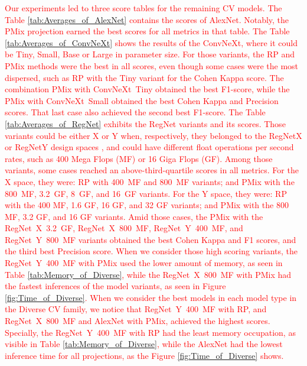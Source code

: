 \textcolor{red}{
Our experiments led to three score tables for the remaining \gls{CV} models.
The Table \ref{tab:Averages_of_AlexNet} contains the scores of AlexNet. Notably, the \gls{PMix} projection earned the best scores for all metrics in that table.
The Table \ref{tab:Averages_of_ConvNeXt} shows the results of the ConvNeXt, where it could be Tiny, Small, Base or Large in parameter size. For those variants, the \gls{RP} and \gls{PMix} methods were the best in all scores, even though some cases were the most dispersed, such as \gls{RP} with the Tiny variant for the Cohen Kappa score. The combination \gls{PMix} with \mbox{ConvNeXt Tiny} obtained the best F1-score, while the \gls{PMix} with \mbox{ConvNeXt Small} obtained the best Cohen Kappa and Precision scores. That last case also achieved the second best F1-score.
The Table \ref{tab:Averages_of_RegNet} exhibits the RegNet variants and its scores. Those variants could be either X or Y when, respectively, they belonged to the RegNetX or RegNetY design spaces \cite{RegNet}, and could have different float operations per second rates, such as 400 Mega Flops (MF) or 16 Giga Flops (GF). Among those variants, some cases reached an above-third-quartile scores in all metrics. For the X space, they were: \gls{RP} with \mbox{400 MF} and \mbox{800 MF} variants; and \gls{PMix} with the \mbox{800 MF}, \mbox{3.2 GF}, \mbox{8 GF}, and \mbox{16 GF} variants. For the Y space, they were: \gls{RP} with the 400 MF, 1.6 GF, 16 GF, and 32 GF variants; and \gls{PMix} with the 800 MF, 3.2 GF, and 16 GF variants. Amid those cases, the \gls{PMix} with the \mbox{RegNet X 3.2 GF}, \mbox{RegNet X 800 MF}, \mbox{RegNet Y 400 MF}, and \mbox{RegNet Y 800 MF} variants obtained the best Cohen Kappa and F1 scores, and the third best Precision score. When we consider those high scoring variants, the \mbox{RegNet Y 400 MF} with \gls{PMix} used the lower amount of memory, as seen in Table \ref{tab:Memory_of_Diverse}, while the \mbox{RegNet X 800 MF} with \gls{PMix} had the fastest inferences of the model variants, as seen in Figure \ref{fig:Time_of_Diverse}.        	
When we consider the best models in each model type in the Diverse \gls{CV} family, we notice that \mbox{RegNet Y 400 MF} with \gls{RP}, and \mbox{RegNet X 800 MF} and AlexNet with \gls{PMix}, achieved the highest scores. Specially, the \mbox{RegNet Y 400 MF} with \gls{RP} had the least memory occupation, as visible in Table \ref{tab:Memory_of_Diverse}, while the AlexNet had the lowest inference time for all projections, as the Figure \ref{fig:Time_of_Diverse} shows.
}

